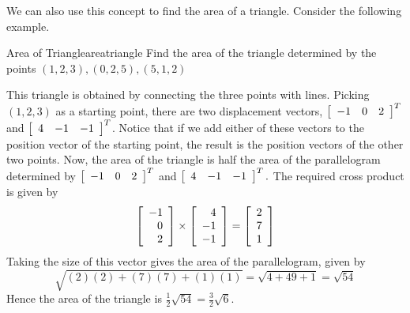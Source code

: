 We can also use this concept to find the area of a triangle. Consider the following
example.

\begin{example}{Area of Triangle}{areatriangle}
Find the area of the triangle determined by the points $\left(1, 2, 3 \right) ,
\left( 0,2,5\right),
\left( 5,1, 2 \right) $ 
\end{example}

\begin{solution}
This triangle is obtained by connecting the three points with lines. Picking
$\left( 1,2,3\right) $ as a starting point, there are two displacement
vectors, $\left[ 
\begin{array}{rrr}
-1 & 0 & 2
\end{array}
\right]^T $ and $\left[ 
\begin{array}{rrr}
4 & -1 & -1
\end{array}
\right]^T $. Notice that if we add either of these vectors to the position vector of the 
starting point, the result is the position vectors of the other two
points. Now, the area of the triangle is half the area of the parallelogram
determined by $\left[ 
\begin{array}{rrr}
-1 & 0 & 2
\end{array}
\right]^T $ and $\left[ 
\begin{array}{rrr}
4 & -1 & -1
\end{array}
\right]^T.$ 
The required cross product is given by
\begin{equation*}
\left[ 
\begin{array}{r}
-1 \\
0 \\
2
\end{array}
\right] \times \left[ 
\begin{array}{r}
4 \\
-1 \\
-1
\end{array}
\right] = \left[
\begin{array}{rrr}
2 \\ 7 \\ 1
\end{array}
\right] 
\end{equation*}
  Taking the size of this vector gives the area of the parallelogram,
given by 
\begin{equation*}
\sqrt{(2)(2) + (7)(7) + (1)(1)}
=
\sqrt{4+49+1}
= \sqrt{54}
\end{equation*}
Hence the area of the triangle is $\frac{1}{2}\sqrt{54}= \frac{3}{2}\sqrt{6}.$
\end{solution}

